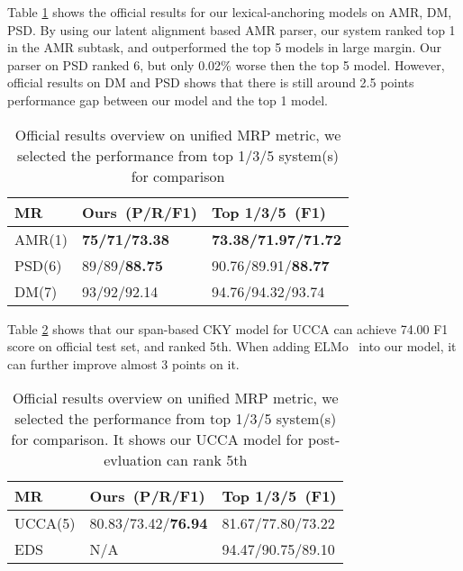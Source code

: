 Table \ref{tbl:results_rank} shows the official results for our
lexical-anchoring models on AMR, DM, PSD.  By using our latent
alignment based AMR parser, our system ranked top 1 in the AMR subtask,
and outperformed the top 5 models in large margin. Our parser on PSD
ranked 6, but only 0.02\% worse then the top 5 model. However, official
results on DM and PSD shows that there is still around 2.5 points
performance gap between our model and the top 1 model.

\begin{table}[!h]
\small
\centering
\begin{tabular}{lll}
\toprule
MR     & Ours~(P/R/F1) & Top 1/3/5~(F1)  \\ \hline
AMR(1) & {\bf 75/71/73.38}   & {\bf 73.38/71.97/71.72} \\
PSD(6) & 89/89/{\bf 88.75}   & 90.76/89.91/{\bf 88.77} \\
DM(7)  & 93/92/92.14   & 94.76/94.32/93.74 \\ \hline
\end{tabular}
\caption{\label{tbl:results_rank} Official results overview on unified MRP metric, we selected the performance from top 1/3/5 system(s) for comparison}
\end{table}

 Table
\ref{tbl:ucca_results_rank} shows that our span-based CKY model for
UCCA can achieve 74.00 F1 score on official test set, and ranked
5th. When adding ELMo~\cite{peters2018deep} into our model, it can further improve almost 3
points on it.
\begin{table}[!h]
  \small
\centering
\begin{tabular}{lll}
\toprule
MR     & Ours~(P/R/F1) & Top 1/3/5~(F1)  \\ \hline
UCCA(5)   & 80.83/73.42/\textbf{76.94}   & 81.67/77.80/73.22 \\
EDS    & N/A                 & 94.47/90.75/89.10 \\ \bottomrule
\end{tabular}
\caption{\label{tbl:ucca_results_rank} Official results overview on
  unified MRP metric, we selected the performance from top 1/3/5
  system(s) for comparison. It shows our UCCA model for post-evluation
  can rank 5th}
\end{table}


